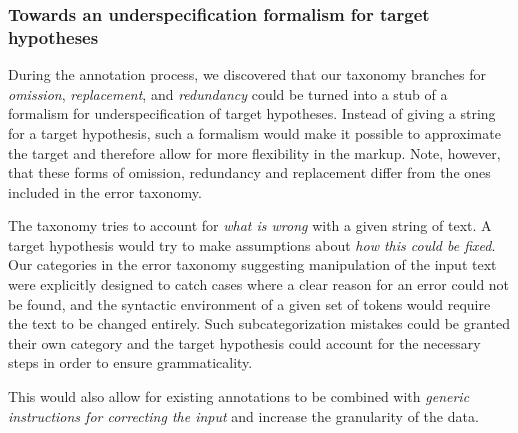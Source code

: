 \documentclass[12pt]{article}
\begin{document}
\subsubsection{Towards an underspecification formalism for target hypotheses}

During the annotation process, we discovered that our taxonomy branches for
\textit{omission}, \textit{replacement}, and \textit{redundancy} could be turned
into a stub of a formalism for underspecification of target hypotheses. Instead
of giving a string for a target hypothesis, such a formalism would make it
possible to approximate the target and therefore allow for more flexibility in
the markup. Note, however, that these forms of omission, redundancy and
replacement differ from the ones included in the error taxonomy.

The taxonomy tries to account for \textit{what is wrong} with a given string of
text. A target hypothesis would try to make assumptions about \textit{how this
could be fixed}. Our categories in the error taxonomy suggesting manipulation of
the input text were explicitly designed to catch cases where a clear reason for
an error could not be found, and the syntactic environment of a given set of
tokens would require the text to be changed entirely. Such subcategorization
mistakes could be granted their own category and the target hypothesis could
account for the necessary steps in order to ensure grammaticality.

This would also allow for existing annotations to be combined with
\textit{generic instructions for correcting the input} and increase the
granularity of the data.
\end{document}
